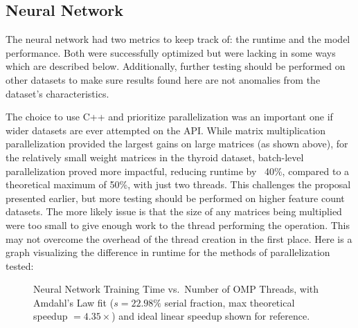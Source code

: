 \documentclass[journal]{IEEEtran}
\begin{document}
\subsection{Neural Network}
\par The neural network had two metrics to keep track of: the runtime and the model performance. Both were successfully optimized but were lacking in some ways which are described below. Additionally, further testing should be performed on other datasets to make sure results found here are not anomalies from the dataset's characteristics.
\par The choice to use C++ and prioritize parallelization was an important one if wider datasets are ever attempted on the API. While matrix multiplication parallelization provided the largest gains on large matrices (as shown above), for the relatively small weight matrices in the thyroid dataset, batch-level parallelization proved more impactful, reducing runtime by ~40\%, compared to a theoretical maximum of 50\%, with just two threads. This challenges the proposal presented earlier, but more testing should be performed on higher feature count datasets. The more likely issue is that the size of any matrices being multiplied were too small to give enough work to the thread performing the operation. This may not overcome the overhead of the thread creation in the first place. Here is a graph visualizing the difference in runtime for the methods of parallelization tested: 

\begin{figure}[H]
\centering
{}
\caption{Neural Network Training Time vs.\ Number of OMP Threads, with Amdahl's Law fit ($s = 22.98\%$ serial fraction, max theoretical speedup $= 4.35\times$) and ideal linear speedup shown for reference.}
\label{fig:amdahl_scaling}
\end{figure}
\end{document}
